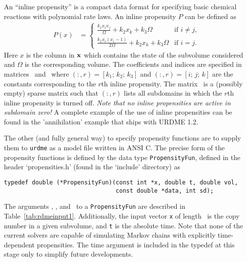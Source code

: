 
An ``inline propensity'' is a compact data format for specifying basic
chemical reactions with polynomial rate laws. An inline propensity $P$
can be defined as
\begin{align*}
  P(x) &= \left\{
 \begin{array}{rl}
    \frac{k_1x_ix_j}{\Omega}+k_2x_k+k_3\Omega & \text{if } i \ne j,	\\
    \frac{k_1x_i(x_i-1)}{2\Omega}+k_2x_k+k_3\Omega & \text{if } i = j.
  \end{array} \right.
\end{align*}
Here $x$ is the column in $\mathbf{x}$ which contains the state of the
subvolume considered and $\Omega$ is the corresponding volume. The
coefficients and indices are specified in matrices \varK\ and \varI\
where \varK$(:,r) = [k_1; \, k_2; \, k_3]$ and \varI$(:,r) = [i; \, j;
\, k]$ are the constants corresponding to the $r$th inline
propensity. The matrix \varS\ is a (possibly empty) sparse matrix such
that \varS$(:,r)$ lists all subdomains in which the $r$th inline
propensity is turned off. \emph{Note that no inline propensities are
active in subdomain zero!} A complete example of the use of inline propensities can be found in the 'annihilation' example that ships with URDME 1.2. 




The other (and fully general way) to specify propensity functions are
to supply them to \texttt{urdme} as a model file written in ANSI
C. The precise form of the propensity functions is defined by the data
type \texttt{PropensityFun}, defined in the header `propensities.h'
(found in the `include' directory) as

\begin{verbatim}
typedef double (*PropensityFun)(const int *x, double t, double vol, 
                                const double *data, int sd);
\end{verbatim}

The arguments \varvol, \vardata, and \varsd\ to a
\texttt{PropensityFun} are described in
Table~\ref{tab:rdmeinput1}. Additionally, the input vector \texttt{x}
of length \varMspecies\ is the copy number in a given subvolume, and
\texttt{t} is the absolute time. Note that none of the current solvers
are capable of simulating Markov chains with explicitly time-dependent
propensities. The time argument is included in the typedef at this
stage only to simplify future developments.
 

